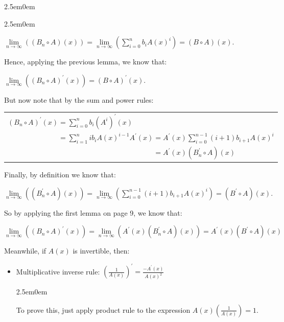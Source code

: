 \documentclass{book}
\newcommand{\hThree}{%
   \color{PineGreen!85!Orange}
   \fontsize{12}{14}\selectfont%
}
\newenvironment{myIndent}{%
   \begin{adjustwidth}{2.5em}{0em}%
}{%
   \end{adjustwidth}%
}
\newcommand{\retTwo}{\hfill\bigbreak}
\begin{document}
\begin{myIndent}
\begin{itemize}
\begin{myIndent}
         {\centering $\lim\limits_{n \rightarrow \infty}( (B_n \circ A)(x)) = \lim\limits_{n \rightarrow \infty}\left( \sum\limits_{i = 0}^n b_i A(x)^i\right) = (B \circ A)(x)$.\retTwo\par}

         Hence, applying the previous lemma, we know that:
         
         {\centering$\lim\limits_{n\rightarrow \infty}((B_n \circ A)^\prime(x)) = (B \circ A)^\prime(x)$.\retTwo\par}

         But now note that by the sum and power rules:

         {\centering
         \begin{tabular}{l}
            $(B_n \circ A)^\prime(x) = \sum\limits_{i = 0}^n b_i (A^i)^\prime(x)$\\ [4pt]
            $\phantom{(B_n \circ A)^\prime(x)} = \sum\limits_{i = 1}^{n}ib_i A(x)^{i-1}A^\prime(x) = A^\prime(x) \sum\limits_{i = 0}^{n-1}(i + 1)b_{i + 1} A(x)^i$\\ [4pt]
            $\phantom{(B_n \circ A)^\prime(x) = \sum\limits_{i = 1}^{n}ib_i A(x)^{i-1}A^\prime(x)} = A^\prime(x)(B_{n}^\prime \circ A)(x)$
         \end{tabular}\retTwo\par}

         Finally, by definition we know that:\\ [-16pt]

         {\centering $\lim\limits_{n \rightarrow \infty}( (B_{n}^\prime \circ A)(x)) = \lim\limits_{n \rightarrow \infty}\left( \sum\limits_{i = 0}^{n - 1} (i + 1) b_{i + 1} A(x)^i\right) = (B^\prime \circ A)(x)$.\retTwo\par}

         So by applying the first lemma on page 9, we know that:
         
         {\centering$\lim\limits_{n\rightarrow \infty}((B_n \circ A)^\prime(x)) = \lim\limits_{n\rightarrow \infty}(A^\prime(x)(B_{n}^\prime \circ A)(x)) = A^\prime(x)(B^\prime \circ A)(x)$\retTwo\par}
      \end{myIndent}
   \end{itemize}

   Meanwhile, if $A(x)$ is invertible, then:
   \begin{itemize}
      \item Multiplicative inverse rule: $(\frac{1}{A(x)})^\prime = \frac{-A^\prime(x)}{A(x)^2}$
      \begin{myIndent}\hThree
         To prove this, just apply product rule to the expression $A(x)(\frac{1}{A(x)}) = 1$.\retTwo
      \end{myIndent}
   \end{itemize}
\end{myIndent}
\end{document}
